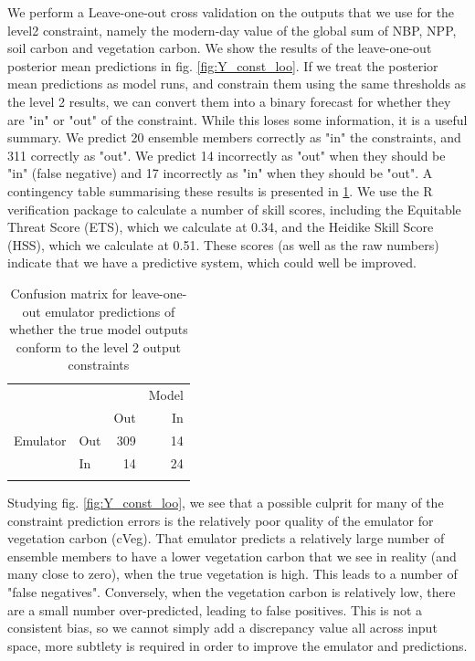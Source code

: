 \documentclass[gmd, manuscript]{copernicus}
\begin{document}
We perform a Leave-one-out cross validation on the outputs that we use for the level2 constraint, namely the modern-day value of the global sum of NBP, NPP, soil carbon and vegetation carbon. We show the results of the leave-one-out posterior mean predictions in fig. \ref{fig:Y_const_loo}. If we treat the posterior mean predictions as model runs, and constrain them using the same thresholds as the level 2 results, we can convert them into a binary forecast for whether they are "in" or "out" of the constraint. While this loses some information, it is a useful summary. We predict 20 ensemble members correctly as "in" the constraints, and 311 correctly as "out". We predict 14 incorrectly as "out" when they should be "in" (false negative) and 17 incorrectly as "in" when they should be "out". A contingency table summarising these results is presented in \ref{table:level_2_contingency}. We use the R verification package \cite{R2015verification} to calculate a number of skill scores, including the Equitable Threat Score (ETS), which we calculate at 0.34, and the Heidike Skill Score (HSS), which we calculate at 0.51. These scores (as well as the raw numbers) indicate that we have a predictive system, which could well be improved.

\begin{table}[t]
\caption{Confusion matrix for leave-one-out emulator predictions of whether the true model outputs conform to the level 2 output constraints}
\label{table:level_2_contingency}
\begin{tabular}{l l r r}
\tophline
 &  &  & Model \\ 
& & Out &  In\\
Emulator & Out & 309 &  14 \\
 & In & 14 & 24 \\

\bottomhline
\end{tabular}
\belowtable{} %

\end{table}

Studying fig. \ref{fig:Y_const_loo}, we see that a possible culprit for many of the constraint prediction errors is the relatively poor quality of the emulator for vegetation carbon (cVeg). That emulator predicts a relatively large number of ensemble members to have a lower vegetation carbon that we see in reality (and many close to zero), when the true vegetation is high. This leads to a number of "false negatives". Conversely, when the vegetation carbon is relatively low, there are a small number over-predicted, leading to false positives. This is not a consistent bias, so we cannot simply add a discrepancy value all across input space, more subtlety is required in order to improve the emulator and predictions.
\end{document}
